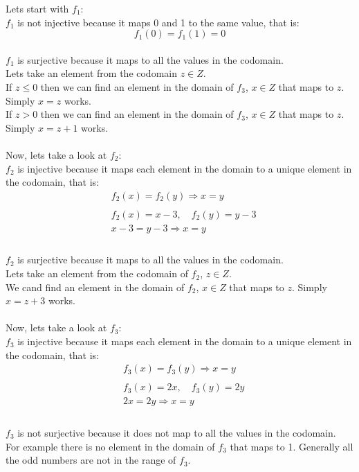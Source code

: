 \documentclass{article}
\begin{document}
Lets start with \(f_1\): \\
\(f_1\) is not injective because it maps 0 and 1 to the same value, that is:
\[
   f_1(0) = f_1(1) = 0
\]
\\
\(f_1\) is surjective because it maps to all the values in the codomain. \\
Lets take an element from the codomain \(z \in Z\). \\
If \(z \leq 0\) then we can find an element in the domain of \(f_3\), \(x \in Z\) that maps to \(z\). Simply \(x = z\) works. \\
If \(z > 0\) then we can find an element in the domain of \(f_3\), \(x \in Z\) that maps to \(z\). Simply \(x = z + 1\) works. \\
\\
Now, lets take a look at \(f_2\): \\
\(f_2\) is injective because it maps each element in the domain to a unique element in the codomain, that is:
\begin{align*}
    & f_2(x) = f_2(y) \Rightarrow x = y \\
    & \\
    & f_2(x) = x - 3,\quad f_2(y) = y - 3    \\
    & x - 3 = y - 3 \Rightarrow x = y \\
\end{align*}
\\
\(f_2\) is surjective because it maps to all the values in the codomain. \\
Lets take an element from the codomain of \(f_2\), \(z \in Z\). \\
We cand find an element in the domain of \(f_2\), \(x \in Z\) that maps to \(z\). Simply \(x = z + 3\) works. \\
\\
Now, lets take a look at \(f_3\): \\
\(f_3\) is injective because it maps each element in the domain to a unique element in the codomain, that is:
\begin{align*}
    & f_3(x) = f_3(y) \Rightarrow x = y \\
    & \\
    & f_3(x) = 2x,\quad f_3(y) = 2y    \\
    & 2x = 2y \Rightarrow x = y \\
\end{align*}
\\
\(f_3\) is not surjective because it does not map to all the values in the codomain. \\
For example there is no element in the domain of \(f_3\) that maps to 1. Generally all the odd numbers are not in the range of \(f_3\). \\
\end{document}
